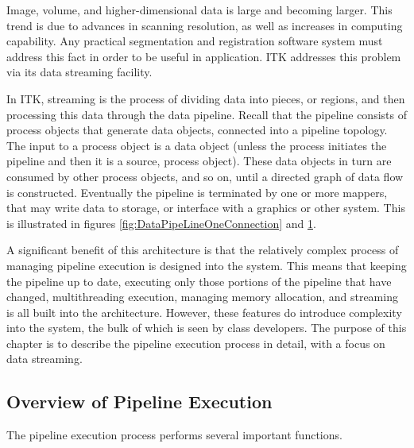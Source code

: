Image, volume, and higher-dimensional data is large and becoming larger. This
trend is due to advances in scanning resolution, as well as increases in
computing capability. Any practical segmentation and registration software
system must address this fact in order to be useful in application. ITK
addresses this problem via its data streaming facility.

In ITK, streaming is the process of dividing data into pieces, or regions,
and then processing this data through the data pipeline. Recall that the
pipeline consists of process objects that generate data objects, connected
into a pipeline topology. The input to a process object is a data object
(unless the process initiates the pipeline and then it is a source, process
object). These data objects in turn are consumed by other process objects,
and so on, until a directed graph of data flow is constructed. Eventually the
pipeline is terminated by one or more mappers, that may write data to
storage, or interface with a graphics or other system. This is illustrated in 
figures \ref{fig:DataPipeLineOneConnection} and \ref{fig:DataPipeLine}.

A significant benefit of this architecture is that the relatively complex
process of managing pipeline execution is designed into the system. This
means that keeping the pipeline up to date, executing only those portions of
the pipeline that have changed, multithreading execution, managing memory
allocation, and streaming is all built into the architecture. However, these
features do introduce complexity into the system, the bulk of which is seen
by class developers. The purpose of this chapter is to describe the pipeline
execution process in detail, with a focus on data streaming.


\subsection{Overview of Pipeline Execution}
\label{sec:OverviewPipelineExecution}

The pipeline execution process performs several important functions.

\begin{figure}
  \par\centering
  \label{fig:DataPipeLine}
  \par
\end{figure}

